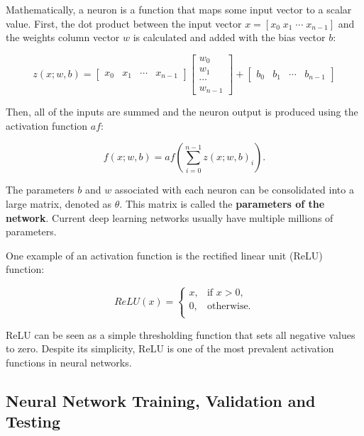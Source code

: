 Mathematically, a neuron is a function that maps some input vector to a scalar value. First, the dot product between the input vector $x = [x_0\; x_1\; \cdots\; x_{n - 1}]$ and the weights column vector $w$ is calculated and added with the bias vector $b$:

\begin{equation}
z(x;w, b) =
\begin{bmatrix}
x_0 & x_1 & \cdots & x_{n - 1}
\end{bmatrix}
\begin{bmatrix}
w_0\\
w_1\\
\cdots\\
w_{n-1}
\end{bmatrix}
+
\begin{bmatrix}
b_0 & b_1 & \cdots & b_{n - 1}
\end{bmatrix}
\end{equation}

Then, all of the inputs are summed and the neuron output is produced using the activation function $af$:

\begin{equation}
f(x;w,b) = af\left(\sum_{i=0}^{n - 1} z(x;w,b)_i\right).
\end{equation}

The parameters $b$ and $w$ associated with each neuron can be consolidated into a large matrix, denoted as $\theta$. This matrix is called the \textbf{parameters of the network}. Current deep learning networks usually have multiple millions of parameters.

One example of an activation function is the rectified linear unit (ReLU) function:

\begin{equation}
ReLU(x) = 
    \begin{cases}
        x, & \text{if } x > 0,\\
        0, & \text{otherwise.}\\
    \end{cases}
\end{equation}

ReLU can be seen as a simple thresholding function that sets all negative values to zero. Despite its simplicity, ReLU is one of the most prevalent activation functions in neural networks.

\subsection{Neural Network Training, Validation and Testing}

